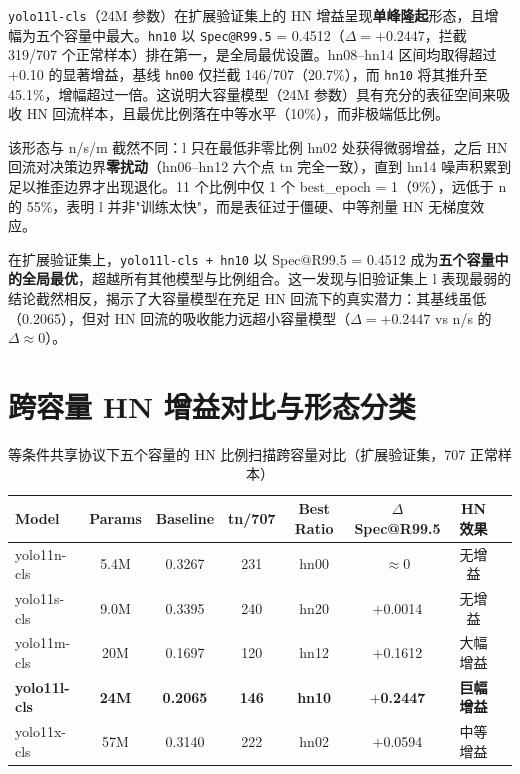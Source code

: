\documentclass[UTF8,openany,12pt]{ctexbook}
\newcommand{\formalmetric}[1]{\texttt{#1}}
\begin{document}
\texttt{yolo11l-cls}（24M 参数）在扩展验证集上的 HN 增益呈现\textbf{单峰隆起}形态，且增幅为五个容量中最大。\texttt{hn10} 以 \formalmetric{Spec@R99.5} = 0.4512（$\Delta = +0.2447$，拦截 319/707 个正常样本）排在第一，是全局最优设置。hn08--hn14 区间均取得超过 $+$0.10 的显著增益，基线 \texttt{hn00} 仅拦截 146/707（20.7\%），而 \texttt{hn10} 将其推升至 45.1\%，增幅超过一倍。这说明大容量模型（24M 参数）具有充分的表征空间来吸收 HN 回流样本，且最优比例落在中等水平（10\%），而非极端低比例。

该形态与 n/s/m 截然不同：l 只在最低非零比例 hn02 处获得微弱增益，之后 HN 回流对决策边界\textbf{零扰动}（hn06--hn12 六个点 tn 完全一致），直到 hn14 噪声积累到足以推歪边界才出现退化。11 个比例中仅 1 个 best\_epoch = 1（9\%），远低于 n 的 55\%，表明 l 并非"训练太快"，而是表征过于僵硬、中等剂量 HN 无梯度效应。

在扩展验证集上，\texttt{yolo11l-cls + hn10} 以 Spec@R99.5 = 0.4512 成为\textbf{五个容量中的全局最优}，超越所有其他模型与比例组合。这一发现与旧验证集上 l 表现最弱的结论截然相反，揭示了大容量模型在充足 HN 回流下的真实潜力：其基线虽低（0.2065），但对 HN 回流的吸收能力远超小容量模型（$\Delta = +0.2447$ vs n/s 的 $\Delta \approx 0$）。

\section{跨容量 HN 增益对比与形态分类}

\begin{table}[H]
    \centering
    \caption{等条件共享协议下五个容量的 HN 比例扫描跨容量对比（扩展验证集，707 正常样本）}
    \label{tab:hn-cross-capacity-summary}
    \begin{tabular}{lccccccc}
        \toprule
        Model & Params & Baseline & tn/707 & Best Ratio & $\Delta$Spec@R99.5 & HN 效果 \\
        \midrule
        yolo11n-cls & 5.4M  & 0.3267 & 231 & hn00 & $\approx$0 & 无增益 \\
        yolo11s-cls & 9.0M  & 0.3395 & 240 & hn20 & $+$0.0014 & 无增益 \\
        yolo11m-cls & 20M   & 0.1697 & 120 & hn12 & $+$0.1612 & 大幅增益 \\
        \textbf{yolo11l-cls} & \textbf{24M} & \textbf{0.2065} & \textbf{146} & \textbf{hn10} & $\boldsymbol{+}$\textbf{0.2447} & \textbf{巨幅增益} \\
        yolo11x-cls & 57M   & 0.3140 & 222 & hn02 & $+$0.0594 & 中等增益 \\
        \bottomrule
    \end{tabular}
\end{table}
\end{document}
